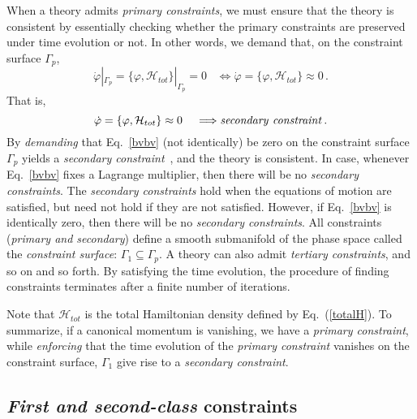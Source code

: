 \documentclass[a4paper,12pt]{article}
\newcommand{\be}{\begin{equation}}
\newcommand{\ee}{\end{equation}}
\newcommand{\Ga}{\Gamma}
\newcommand{\+}{^{\dagger}}
\newcommand{\2}{\frac{1}{2}}
\newcommand{\3}{\frac{1}{3}}
\newcommand{\4}{\frac{1}{4}}
\newcommand{\6}{\frac{1}{6}}
\newcommand{\8}{\frac{1}{8}}
\begin{document}
When a theory admits \textit{primary constraints}, we must ensure that the theory is consistent by essentially 
checking whether the primary constraints are preserved under time evolution or not. In other words, we demand that, on the constraint surface $\Ga_p$, \begin{equation}\label{bvbv}
\dot\varphi |_{\Ga_p}=\{\varphi,\mathcal{H}_{tot}\}|_{\Ga_p}=0\,~~~\Longleftrightarrow \dot\varphi =\{\varphi,\mathcal{H}_{tot}\}\approx 0 \,.
\end{equation}
That is,
\be
\dot\varphi =\{\varphi,\mathcal{H}_{tot}\}\approx 0\,~~~\Longrightarrow {\it secondary~constraint} \,.
\ee
By \textit{demanding} that Eq.~\eqref{bvbv} (not identically) be zero on the constraint surface $\Ga_p$ yields a \textit{secondary constraint}~\cite{Anderson:1951ta,Matschull:1996up}, and the theory is consistent. In case, whenever Eq.~\eqref{bvbv} fixes a Lagrange multiplier, then there will be no \textit{secondary constraints}. The \textit{secondary constraints} hold when the equations of motion are satisfied, but need not hold if they are not satisfied. However, if Eq.~\eqref{bvbv} is identically zero, then there will be no {\it secondary constraints}. All constraints ({\it primary and secondary}) define a smooth submanifold of the phase space called the 
\textit{constraint surface}: $\Ga_1 \subseteq \Ga_p$.  
A theory can also admit \textit{tertiary constraints}, and so on and so forth. By satisfying the time evolution,  the procedure of finding constraints terminates after a finite number of iterations.

Note that $\mathcal{H}_{tot}$ is the total Hamiltonian density defined by Eq.~(\ref{totalH}). 
To summarize, if a canonical momentum is vanishing, we have a \textit{primary constraint}, while \textit{enforcing} that the time evolution of the {\it primary constraint}  vanishes on the constraint surface, $\Ga_1$ give rise to a \textit{secondary constraint}.


\subsection{{\it First and second-class} constraints}
\end{document}
